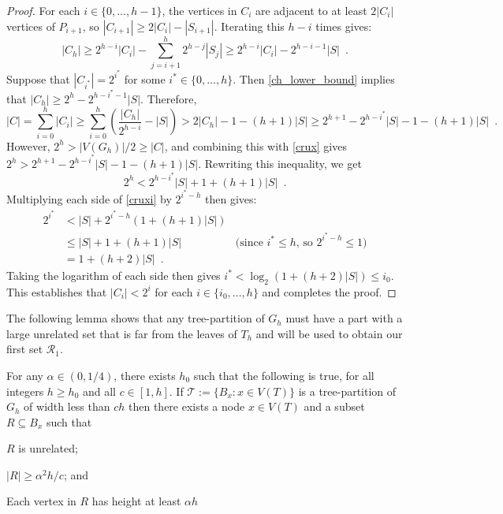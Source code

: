 \documentclass{patmorin}
\renewcommand{\le}{\leqslant}
\renewcommand{\ge}{\geqslant}
\begin{document}
\begin{proof}
  For each $i\in\{0,\ldots,h-1\}$, the vertices in $C_i$ are adjacent to at least $2|C_i|$ vertices of $P_{i+1}$, so $|C_{i+1}|\ge 2|C_i|-|S_{i+1}|$.  Iterating this $h-i$ times gives:
  \begin{equation}
    |C_h| \ge 2^{h-i}|C_i| - \sum_{j=i+1}^h 2^{h-j}|S_j| \ge 2^{h-i}|C_i| - 2^{h-i-1}|S| \enspace . \label{ch_lower_bound}
  \end{equation}
  Suppose that $|C_{i^*}|=2^{i^*}$ for some $i^*\in\{0,\ldots,h\}$. Then \cref{ch_lower_bound} implies that $|C_h|\ge 2^h-2^{h-i^*-1}|S|$.  Therefore,
  \begin{equation}
      |C|
         =\sum_{i=0}^h |C_i| \ge \sum_{i=0}^h\left(\frac{|C_h|}{2^{h-i}} - |S|\right)
       > 2|C_h| - 1 -(h+1)|S|
       \ge 2^{h+1}-2^{h-i^*}|S|-1 - (h+1)|S| \enspace .  \label{crux}
  \end{equation}
  However, $2^h > |V(G_h)|/2 \ge |C|$, and combining this with \cref{crux} gives $2^h > 2^{h+1} - 2^{h-i^*}|S|-1-(h+1)|S|$.
  Rewriting this inequality, we get
  \begin{equation}
     2^h < 2^{h-i^*}|S|+ 1 + (h+1)|S| \enspace . \label{cruxi}
  \end{equation}
  Multiplying each side of \cref{cruxi} by $2^{i^*-h}$ then gives:
  \begin{align*}
    2^{i^*} & <  |S| + 2^{i^*-h}(1+(h+1)|S|) \\
            & \le |S| + 1 + (h+1)|S| & \text{(since $i^*\le h$, so $2^{i^*-h}\le 1$)} \\
            & = 1+ (h+2)|S| \enspace .
  \end{align*}
  Taking the logarithm of each side then gives $i^* < \log_2(1+(h+2)|S|)\le i_0$.  This establishes that $|C_i|< 2^i$ for each $i\in\{i_0,\ldots,h\}$ and  completes the proof.
\end{proof}

The following lemma shows that any tree-partition of $G_h$ must have a part with a large unrelated set that is far from the leaves of $T_h$ and will be used to obtain our first set $\mathcal{R}_1$.

\begin{lem}\label{startup}
  For any $\alpha\in(0,1/4)$, there exists $h_0$ such that the following is true, for all integers $h\ge  h_0$ and all $c\in[1,h]$.  If $\mathcal{T}:=\{B_x:x\in V(T)\}$ is a tree-partition of $G_h$ of width less than $ch$ then there exists a node $x\in V(T)$ and a subset $R\subseteq B_x$ such that
  \begin{compactenum}[(i)]
    \item $R$ is unrelated;
    \item $|R|\ge \alpha^2 h/c$; and
    \item Each vertex in $R$ has height at least $\alpha h$
  \end{compactenum}
\end{lem}
\end{document}
